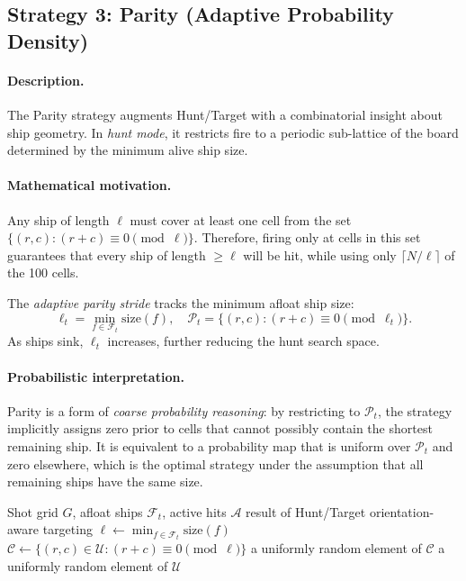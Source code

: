 \documentclass[12pt,a4paper]{article}
\newcommand{\1}{\mathbf{1}}
\begin{document}
\subsection{Strategy 3: Parity (Adaptive Probability Density)}
\label{sec:parity}

\paragraph{Description.}
The Parity strategy augments Hunt/Target with a combinatorial insight about
ship geometry.  In \emph{hunt mode}, it restricts fire to a periodic sub-lattice
of the board determined by the minimum alive ship size.

\paragraph{Mathematical motivation.}
Any ship of length $\ell$ must cover at least one cell from the set
$\{(r,c) : (r+c) \equiv 0 \pmod{\ell}\}$.  Therefore, firing only at cells
in this set guarantees that every ship of length $\geq \ell$ will be hit,
while using only $\lceil N/\ell \rceil$ of the 100 cells.

The \emph{adaptive parity stride} tracks the minimum afloat ship size:
\begin{equation}
  \ell_t = \min_{f \in \mathcal{F}_t} \mathrm{size}(f),
  \quad \mathcal{P}_t = \{(r,c) : (r+c) \equiv 0 \pmod{\ell_t}\}.
\end{equation}
As ships sink, $\ell_t$ increases, further reducing the hunt search space.

\paragraph{Probabilistic interpretation.}
Parity is a form of \emph{coarse probability reasoning}: by restricting to
$\mathcal{P}_t$, the strategy implicitly assigns zero prior to cells that cannot
possibly contain the shortest remaining ship.  It is equivalent to a probability
map that is uniform over $\mathcal{P}_t$ and zero elsewhere, which is the optimal
strategy under the assumption that all remaining ships have the same size.

\begin{algorithm}[H]
  \caption{Parity Strategy}
  \begin{algorithmic}[1]
    \Require Shot grid $G$, afloat ships $\mathcal{F}_t$, active hits $\mathcal{A}$
      \State \Return result of Hunt/Target orientation-aware targeting
    \EndIf
    \State $\ell \gets \min_{f \in \mathcal{F}_t} \mathrm{size}(f)$
    \State $\mathcal{C} \gets \{(r,c) \in \mathcal{U} : (r+c) \equiv 0 \pmod{\ell}\}$
      \State \Return a uniformly random element of $\mathcal{C}$
    \Else
      \State \Return a uniformly random element of $\mathcal{U}$
    \EndIf
  \end{algorithmic}
\end{algorithm}
\end{document}
